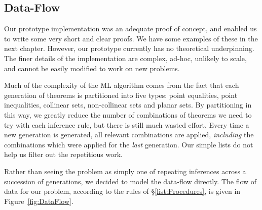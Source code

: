 \subsection{Data-Flow}
Our prototype implementation was an adequate proof of concept, and enabled us to write some very short and clear proofs. We have some examples of these in the next chapter. However, our prototype currently has no theoretical underpinning. The finer details of the implementation are complex, ad-hoc, unlikely to scale, and cannot be easily modified to work on new problems. 

Much of the complexity of the ML algorithm comes from the fact that each generation of theorems is partitioned into five types: point equalities, point inequalities, collinear sets, non-collinear sets and planar sets. By partitioning in this way, we greatly reduce the number of combinations of theorems we need to try with each inference rule, but there is still much wasted effort. Every time a new generation is generated, all relevant combinations are applied, \emph{including} the combinations which were applied for the \emph{last} generation. Our simple lists do not help us filter out the repetitious work.

Rather than seeing the problem as simply one of repeating inferences across a succession of generations, we decided to model the data-flow directly. The flow of data for our problem, according to the rules of \S\ref{list:Procedures}, is given in Figure~\ref{fig:DataFlow}.

